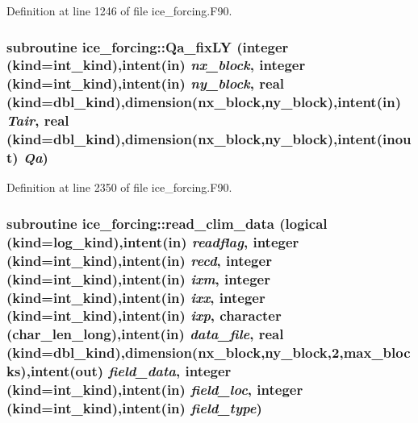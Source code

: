 Definition at line 1246 of file ice\_\-forcing.F90.\hypertarget{namespaceice__forcing_a72e60597f70954128768b0082b1a4579}{
\subsubsection[{Qa\_\-fixLY}]{\setlength{\rightskip}{0pt plus 5cm}subroutine ice\_\-forcing::Qa\_\-fixLY (integer (kind=int\_\-kind),intent(in) {\em nx\_\-block}, \/  integer (kind=int\_\-kind),intent(in) {\em ny\_\-block}, \/  real (kind=dbl\_\-kind),dimension(nx\_\-block,ny\_\-block),intent(in) {\em Tair}, \/  real (kind=dbl\_\-kind),dimension(nx\_\-block,ny\_\-block),intent(inout) {\em Qa})}}
\label{namespaceice__forcing_a72e60597f70954128768b0082b1a4579}


Definition at line 2350 of file ice\_\-forcing.F90.\hypertarget{namespaceice__forcing_ae59c1f1aebe7408876c324fd7e2f5e5f}{
\subsubsection[{read\_\-clim\_\-data}]{\setlength{\rightskip}{0pt plus 5cm}subroutine ice\_\-forcing::read\_\-clim\_\-data (logical (kind=log\_\-kind),intent(in) {\em readflag}, \/  integer (kind=int\_\-kind),intent(in) {\em recd}, \/  integer (kind=int\_\-kind),intent(in) {\em ixm}, \/  integer (kind=int\_\-kind),intent(in) {\em ixx}, \/  integer (kind=int\_\-kind),intent(in) {\em ixp}, \/  character (char\_\-len\_\-long),intent(in) {\em data\_\-file}, \/  real (kind=dbl\_\-kind),dimension(nx\_\-block,ny\_\-block,2,max\_\-blocks),intent(out) {\em field\_\-data}, \/  integer (kind=int\_\-kind),intent(in) {\em field\_\-loc}, \/  integer (kind=int\_\-kind),intent(in) {\em field\_\-type})}}
\label{namespaceice__forcing_ae59c1f1aebe7408876c324fd7e2f5e5f}


